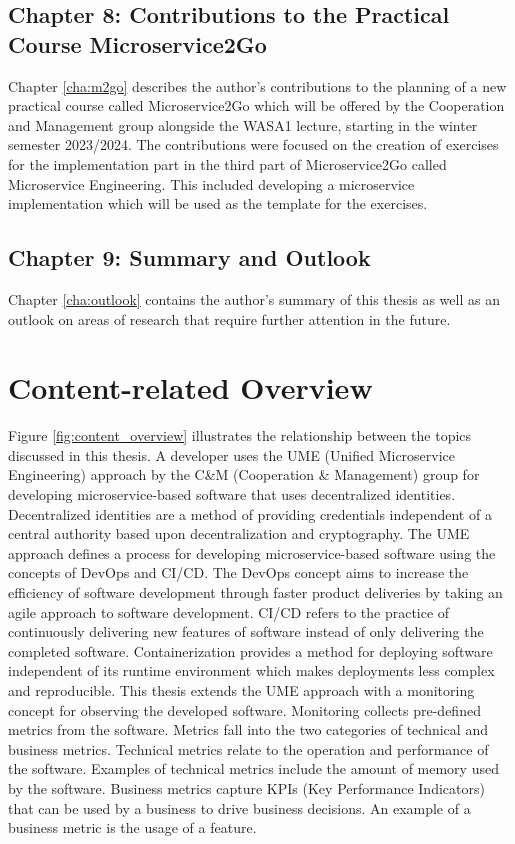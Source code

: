 \subsection*{Chapter 8: Contributions to the Practical Course Microservice2Go}

Chapter \ref{cha:m2go} describes the author's contributions to the planning
of a new practical course called Microservice2Go which will be offered by the
Cooperation and Management group alongside the WASA1 lecture, starting in the winter semester
2023/2024. The contributions were focused on the creation of exercises for the implementation part
in the third part of Microservice2Go called Microservice Engineering. This included
developing a microservice implementation which will be used as the template for the exercises.

\subsection*{Chapter 9: Summary and Outlook}

Chapter \ref{cha:outlook} contains the author's summary of this thesis
as well as an outlook on areas of research that require further attention in the future.

\section{Content-related Overview}
\label{sec:content_overview}

Figure \ref{fig:content_overview} illustrates the relationship between the topics
discussed in this thesis. A developer uses the UME (Unified Microservice Engineering) approach
by the C\&M (Cooperation \& Management) group for developing microservice-based software
that uses decentralized identities. Decentralized identities are a method of providing
credentials independent of a central authority based upon decentralization and cryptography.
The UME approach defines a process for developing microservice-based software
using the concepts of DevOps and CI/CD.
The DevOps concept aims to increase the efficiency of software development
through faster product deliveries by taking an agile approach to software development.
CI/CD refers to the practice of continuously delivering new features of software instead
of only delivering the completed software. Containerization provides a method for
deploying software independent of its runtime environment which makes deployments
less complex and reproducible. This thesis extends the UME approach
with a monitoring concept for observing the developed software.
Monitoring collects pre-defined metrics from the software.
Metrics fall into the two categories of technical and business metrics.
Technical metrics relate to the operation and performance of the software.
Examples of technical metrics include the amount of memory used by the software.
Business metrics capture KPIs (Key Performance Indicators) that can be used
by a business to drive business decisions. An example of a business metric
is the usage of a feature.

